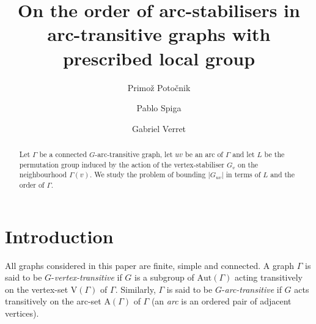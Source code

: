 \documentclass{amsart}
\theoremstyle{definition}
\begin{document}
\title[On the order of arc-stabilisers]{On the order of arc-stabilisers in arc-transitive graphs with prescribed local group}

\author[P. Poto\v{c}nik]{Primo\v{z} Poto\v{c}nik}
\address{Primo\v{z} Poto\v{c}nik,\newline
 Faculty of Mathematics and Physics,
 University of Ljubljana, \newline 
Jadranska 19, 1000 Ljubljana, Slovenia}

\author[P. Spiga]{Pablo Spiga}
\address{Pablo Spiga,\newline
 University of Milano-Bicocca, Departimento di Matematica Pura e Applicata, \newline
 Via Cozzi 53, 20126 Milano Italy} 
 
 
\author[G. Verret]{Gabriel Verret}
\address{Gabriel Verret,\newline
Faculty of Mathematics, Nat. Sci. and Info. Tech., University of Primorska, \newline 
Glagolja\v{s}ka 8, 6000 Koper, Slovenia}


\begin{abstract}
Let $\Gamma$ be a connected $G$-arc-transitive graph, let $uv$ be an arc of $\Gamma$ and let $L$ be the permutation group induced by the action of the vertex-stabiliser $G_v$ on the neighbourhood $\Gamma(v)$. We study the problem of bounding $|G_{uv}|$ in terms of $L$ and the order of $\Gamma$.
\end{abstract}

\maketitle

\section{Introduction}
All graphs considered in this paper are finite, simple and connected. A graph $\Gamma$ is said to be $G$-\emph{vertex-transitive} if $G$ is a subgroup of ${\mathrm{Aut}}(\Gamma)$ acting transitively on the vertex-set ${\mathrm V}(\Gamma)$ of $\Gamma$. Similarly, $\Gamma$ is said to be $G$-\emph{arc-transitive} if $G$ acts transitively on the arc-set ${\mathrm A}(\Gamma)$ of $\Gamma$ (an \emph{arc} is an ordered pair of adjacent vertices). 
\end{document}
